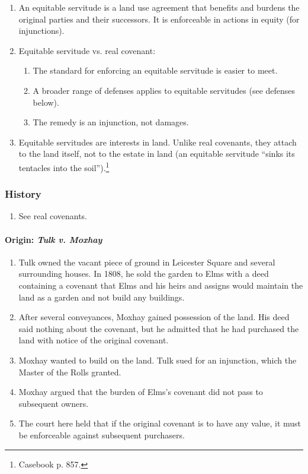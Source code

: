 \begin{enumerate}
    \item An equitable servitude is a land use agreement that benefits and 
    burdens the original parties and their successors. It is enforceable in 
    actions in equity (for injunctions).
    \item Equitable servitude vs. real covenant:
    \begin{enumerate}
        \item The standard for enforcing an equitable servitude is easier to 
        meet.
        \item A broader range of defenses applies to equitable servitudes (see 
        defenses below).
        \item The remedy is an injunction, not damages.
    \end{enumerate}
    \item Equitable servitudes are interests in land. Unlike real covenants, 
    they attach to the land itself, not to the estate in land (an equitable 
    servitude ``sinks its tentacles into the soil'').\footnote{Casebook p. 
    857.}
\end{enumerate}

\subsubsection{History}

\begin{enumerate}
    \item See real covenants.
\end{enumerate}

\paragraph{Origin: \emph{Tulk v. Moxhay}}

\begin{enumerate}
    \item Tulk owned the vacant piece of ground in Leicester Square and 
    several surrounding houses. In 1808, he sold the garden to Elms with a 
    deed containing a covenant that Elms and his heirs and assigns would 
    maintain the land as a garden and not build any buildings.
    \item After several conveyances, Moxhay gained possession of the land. His 
    deed said nothing about the covenant, but he admitted that he had 
    purchased the land with notice of the original covenant.
    \item Moxhay wanted to build on the land. Tulk sued for an injunction, 
    which the Master of the Rolls granted.
    \item Moxhay argued that the burden of Elms's covenant did not pass to 
    subsequent owners.
    \item The court here held that if the original covenant is to have any 
    value, it must be enforceable against subsequent purchasers.
\end{enumerate}

